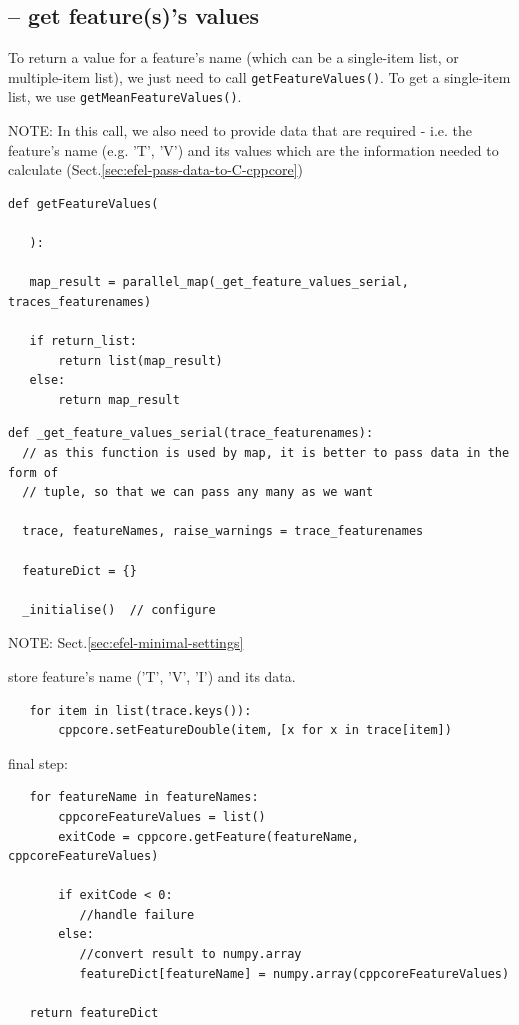 \subsection{-- get feature(s)'s values}


To return a value for a feature's name (which can be a single-item list, or
multiple-item list), we just need to call \verb!getFeatureValues()!. To get a
single-item list, we use \verb!getMeanFeatureValues()!.

NOTE: In this call, we also need to provide data that are required - i.e. the
feature's name (e.g. 'T', 'V') and its values which are the information needed
to calculate (Sect.\ref{sec:efel-pass-data-to-C-cppcore}) 

\begin{lstlisting}
def getFeatureValues(
   
   ):
   
   map_result = parallel_map(_get_feature_values_serial, traces_featurenames)
   
   if return_list:
       return list(map_result)
   else:
       return map_result
\end{lstlisting}

\begin{lstlisting}
def _get_feature_values_serial(trace_featurenames):
  // as this function is used by map, it is better to pass data in the form of
  // tuple, so that we can pass any many as we want
  
  trace, featureNames, raise_warnings = trace_featurenames
  
  featureDict = {}
  
  _initialise()  // configure
\end{lstlisting}
NOTE: Sect.\ref{sec:efel-minimal-settings}

store feature's name ('T', 'V', 'I')  and its data.  
\begin{lstlisting}
   for item in list(trace.keys()):
       cppcore.setFeatureDouble(item, [x for x in trace[item])
\end{lstlisting}

final step:
\begin{lstlisting}
   for featureName in featureNames:
       cppcoreFeatureValues = list()
       exitCode = cppcore.getFeature(featureName, cppcoreFeatureValues)
       
       if exitCode < 0:
          //handle failure
       else:
          //convert result to numpy.array
          featureDict[featureName] = numpy.array(cppcoreFeatureValues)
   
   return featureDict
\end{lstlisting}

